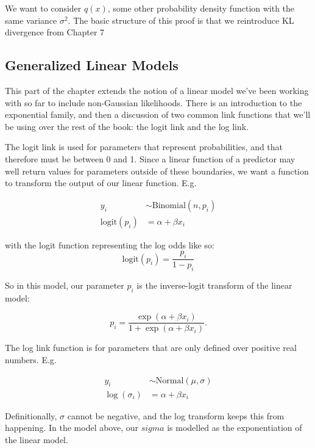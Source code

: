 \documentclass[
]{book}
\begin{document}
We want to consider \(q(x)\), some other probability density function with the same variance \(\sigma^2\). The basic structure of this proof is that we reintroduce KL divergence from Chapter 7

\hypertarget{generalized-linear-models}{%
\subsection*{Generalized Linear Models}\label{generalized-linear-models}}

This part of the chapter extends the notion of a linear model we've been working with so far to include non-Gaussian likelihoods. There is an introduction to the exponential family, and then a discussion of two common link functions that we'll be using over the rest of the book: the logit link and the log link.

The logit link is used for parameters that represent probabilities, and that therefore must be between 0 and 1. Since a linear function of a predictor may well return values for parameters outside of these boundaries, we want a function to transform the output of our linear function. E.g.

\[
\begin{aligned}
y_i &\sim \text{Binomial}(n,p_i) \\
\text{logit}(p_i) &= \alpha + \beta x_i
\end{aligned}
\]

with the logit function representing the log odds like so:
\[
\text{logit}(p_i) = \frac{p_i}{1 - p_i}
\]

So in this model, our parameter \(p_i\) is the inverse-logit transform of the linear model:

\[
p_i = \frac{\exp(\alpha + \beta x_i)}{1 + \exp(\alpha + \beta x_i)}.
\]

The log link function is for parameters that are only defined over positive real numbers. E.g.

\[
\begin{aligned}
y_i &\sim \text{Normal}(\mu,\sigma) \\
\log(\sigma_i) &= \alpha + \beta x_i
\end{aligned}
\]

Definitionally, \(\sigma\) cannot be negative, and the log transform keeps this from happening. In the model above, our \(sigma\) is modelled as the exponentiation of the linear model.
\end{document}
